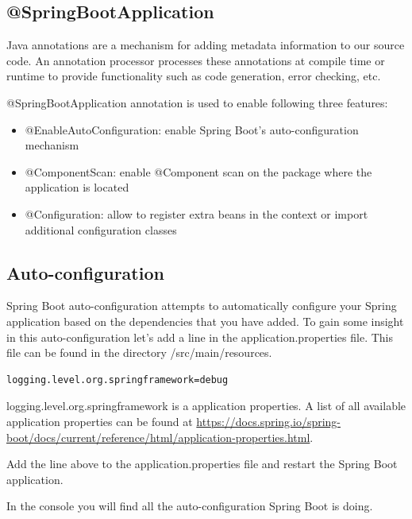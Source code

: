 \subsection{@SpringBootApplication}

Java annotations are a mechanism for adding metadata information to our source code. An annotation processor processes these annotations at compile time or runtime to provide functionality such as code generation, error checking, etc.

@SpringBootApplication annotation is used to enable following three features:
\begin{itemize}
\item @EnableAutoConfiguration: enable Spring Boot’s auto-configuration mechanism
\item @ComponentScan: enable @Component scan on the package where the application is located
\item @Configuration: allow to register extra beans in the context or import additional configuration classes
\end{itemize}


\subsection{Auto-configuration}

Spring Boot auto-configuration attempts to automatically configure your Spring application based on the dependencies that you have added.
To gain some insight in this auto-configuration let's add a line in the application.properties file. This file can be found in the directory /src/main/resources. 

\begin{lstlisting}
logging.level.org.springframework=debug
\end{lstlisting}

logging.level.org.springframework is a application properties. A list of all available application properties can be found at \url{https://docs.spring.io/spring-boot/docs/current/reference/html/application-properties.html}.

\begin{oefening}
Add the line above to the application.properties file and restart the Spring Boot application.
\end{oefening}

In the console you will find all the auto-configuration Spring Boot is doing.